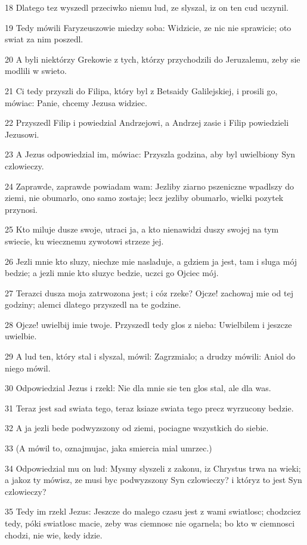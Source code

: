 \par 18 Dlatego tez wyszedl przeciwko niemu lud, ze slyszal, iz on ten cud uczynil.
\par 19 Tedy mówili Faryzeuszowie miedzy soba: Widzicie, ze nic nie sprawicie; oto swiat za nim poszedl.
\par 20 A byli niektórzy Grekowie z tych, którzy przychodzili do Jeruzalemu, zeby sie modlili w swieto.
\par 21 Ci tedy przyszli do Filipa, który byl z Betsaidy Galilejskiej, i prosili go, mówiac: Panie, chcemy Jezusa widziec.
\par 22 Przyszedl Filip i powiedzial Andrzejowi, a Andrzej zasie i Filip powiedzieli Jezusowi.
\par 23 A Jezus odpowiedzial im, mówiac: Przyszla godzina, aby byl uwielbiony Syn czlowieczy.
\par 24 Zaprawde, zaprawde powiadam wam: Jezliby ziarno pszeniczne wpadlszy do ziemi, nie obumarlo, ono samo zostaje; lecz jezliby obumarlo, wielki pozytek przynosi.
\par 25 Kto miluje dusze swoje, utraci ja, a kto nienawidzi duszy swojej na tym swiecie, ku wiecznemu zywotowi strzeze jej.
\par 26 Jezli mnie kto sluzy, niechze mie nasladuje, a gdziem ja jest, tam i sluga mój bedzie; a jezli mnie kto sluzyc bedzie, uczci go Ojciec mój.
\par 27 Terazci dusza moja zatrwozona jest; i cóz rzeke? Ojcze! zachowaj mie od tej godziny; alemci dlatego przyszedl na te godzine.
\par 28 Ojcze! uwielbij imie twoje. Przyszedl tedy glos z nieba: Uwielbilem i jeszcze uwielbie.
\par 29 A lud ten, który stal i slyszal, mówil: Zagrzmialo; a drudzy mówili: Aniol do niego mówil.
\par 30 Odpowiedzial Jezus i rzekl: Nie dla mnie sie ten glos stal, ale dla was.
\par 31 Teraz jest sad swiata tego, teraz ksiaze swiata tego precz wyrzucony bedzie.
\par 32 A ja jezli bede podwyzszony od ziemi, pociagne wszystkich do siebie.
\par 33 (A mówil to, oznajmujac, jaka smiercia mial umrzec.)
\par 34 Odpowiedzial mu on lud: Mysmy slyszeli z zakonu, iz Chrystus trwa na wieki; a jakoz ty mówisz, ze musi byc podwyzszony Syn czlowieczy? i któryz to jest Syn czlowieczy?
\par 35 Tedy im rzekl Jezus: Jeszcze do malego czasu jest z wami swiatlosc; chodzciez tedy, póki swiatlosc macie, zeby was ciemnosc nie ogarnela; bo kto w ciemnosci chodzi, nie wie, kedy idzie.
